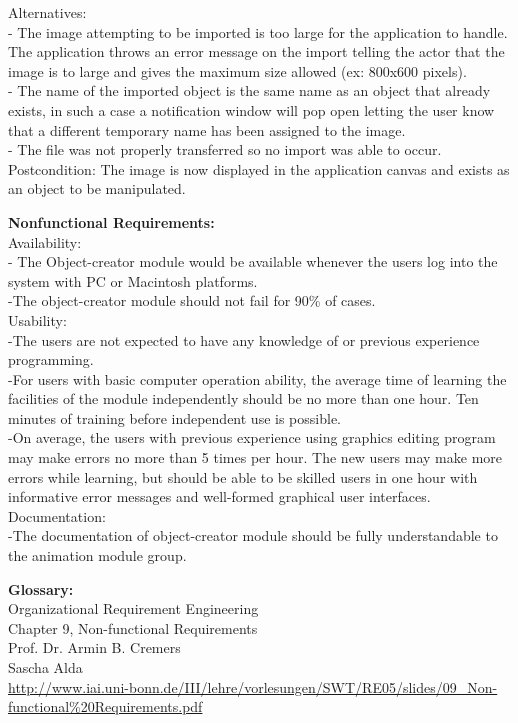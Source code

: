 \documentclass[12pt]{report}
\begin{document}
Alternatives:\\
- The image attempting to be imported is too large for the application to handle. The application throws an error message on the import telling the actor that the image is to large and gives the maximum size allowed (ex: 800x600 pixels). \\
- The name of the imported object is the same name as an object that already exists, in such a case a notification window will pop open letting the user know that a different temporary name has been assigned to the image. \\
- The file was not properly transferred so no import was able to occur.\\
Postcondition:  The image is now displayed in the application canvas and exists as an object to be manipulated.

\pagebreak

{\bf\large Nonfunctional Requirements:}\\[1\baselineskip]
Availability: \\
- The Object-creator module would be available whenever the users log into the system with PC or Macintosh platforms.\\
-The object-creator module should not fail for 90\% of cases.\\[0\baselineskip]

Usability: \\
-The users are not expected to have any knowledge of or previous experience programming.\\
-For users with basic computer operation ability, the average time of learning the facilities of the module independently should be no more than one hour. Ten minutes of training before independent use is possible. \\
-On average, the users with previous experience using graphics editing program may make errors no more than 5 times per hour. The new users may make more errors while learning, but should be able to be skilled users in one hour with informative error messages and well-formed graphical user interfaces.\\[0\baselineskip]

Documentation:\\
-The documentation of object-creator module should be fully understandable to the animation module group.\\
\pagebreak

{\bf\large Glossary:}\\[1\baselineskip]
Organizational Requirement Engineering\\
Chapter 9, Non-functional Requirements\\
Prof. Dr. Armin B. Cremers\\
Sascha Alda\\
\url{http://www.iai.uni-bonn.de/III/lehre/vorlesungen/SWT/RE05/slides/09_Non-functional\%20Requirements.pdf}
\end{document}
